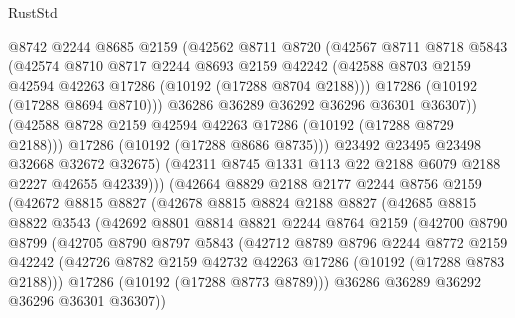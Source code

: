\begin{lexlean}{RustStd}
\begin{coremodule}
                  @8742
                  @2244
                  @8685
                  @2159
                  (@42562
                    @8711
                    @8720
                    (@42567
                      @8711
                      @8718
                      @5843
                      (@42574
                        @8710
                        @8717
                        @2244
                        @8693
                        @2159
                        @42242
                        (@42588 @8703 @2159 @42594 @42263 @17286 (@10192 (@17288 @8704 @2188)))
                        @17286
                        (@10192 (@17288 @8694 @8710)))
                      @36286
                      @36289
                      @36292
                      @36296
                      @36301
                      @36307))
                  (@42588 @8728 @2159 @42594 @42263 @17286 (@10192 (@17288 @8729 @2188)))
                  @17286
                  (@10192 (@17288 @8686 @8735)))
                @23492
                @23495
                @23498
                @32668
                @32672
                @32675)
              (@42311 @8745 @1331 @113 @22 @2188 @6079 @2188 @2227 @42655 @42339)))
          (@42664
            @8829
            @2188
            @2177
            @2244
            @8756
            @2159
            (@42672
              @8815
              @8827
              (@42678
                @8815
                @8824
                @2188
                @8827
                (@42685
                  @8815
                  @8822
                  @3543
                  (@42692
                    @8801
                    @8814
                    @8821
                    @2244
                    @8764
                    @2159
                    (@42700
                      @8790
                      @8799
                      (@42705
                        @8790
                        @8797
                        @5843
                        (@42712
                          @8789
                          @8796
                          @2244
                          @8772
                          @2159
                          @42242
                          (@42726 @8782 @2159 @42732 @42263 @17286 (@10192 (@17288 @8783 @2188)))
                          @17286
                          (@10192 (@17288 @8773 @8789)))
                        @36286
                        @36289
                        @36292
                        @36296
                        @36301
                        @36307))

\end{coremodule}
\end{lexlean}
